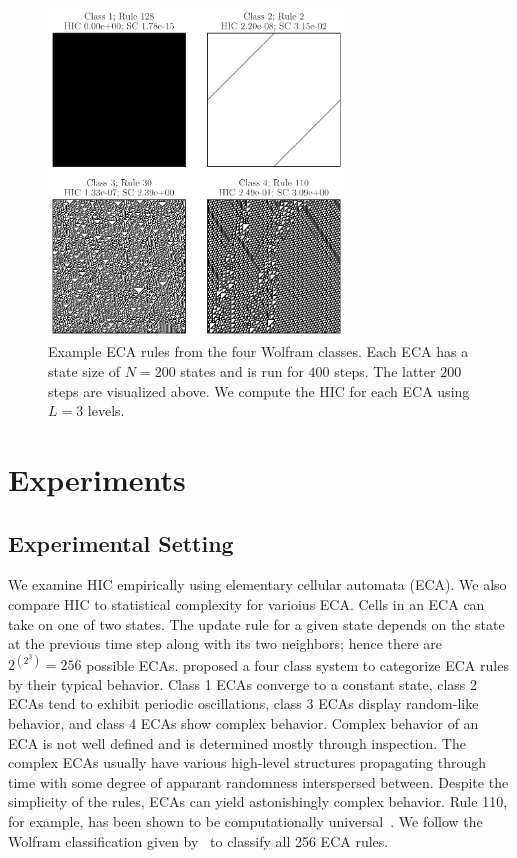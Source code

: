 \begin{figure}[ht]
\centering
\includegraphics[width=0.7\textwidth]{figures/eca_images_and_complexity}
\caption{Example ECA rules from the four Wolfram classes. Each ECA has a state
    size of $N=200$ states and is run for $400$ steps. The latter $200$ steps
    are visualized above. We compute the HIC for each ECA using $L=3$ levels.}
\label{fig:eca_images_and_complexity}
\end{figure}

\section{Experiments}

\subsection{Experimental Setting}

We examine HIC empirically using elementary cellular automata (ECA). We also
compare HIC to statistical complexity for varioius ECA. Cells in an ECA
can take on one of two states. The update rule for a given state depends on the
state at the previous time step along with its two neighbors; hence there are
$2^{(2^3)} = 256$ possible ECAs. \citet{wolfram1983} proposed a four class
system to categorize ECA rules by their typical behavior. Class 1 ECAs converge
to a constant state, class 2 ECAs tend to exhibit periodic oscillations, class
3 ECAs display random-like behavior, and class 4 ECAs show complex behavior.
Complex behavior of an ECA is not well defined and is determined mostly through
inspection. The complex ECAs usually have various high-level structures
propagating through time with some degree of apparant randomness interspersed
between. Despite the simplicity of the rules, ECAs can yield astonishingly
complex behavior. Rule 110, for example, has been shown to be computationally
universal~\citep{cook2004universality}. We follow the Wolfram classification
given by~\citet[table 2]{martinez2013note} to classify all 256 ECA rules.

